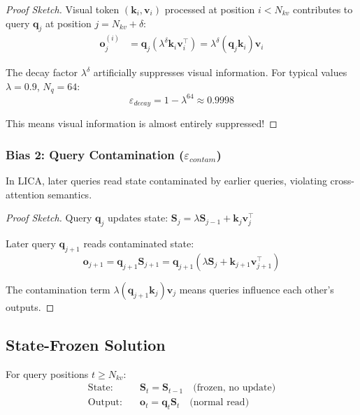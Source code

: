 \begin{proof}[Proof Sketch]
Visual token $(\mathbf{k}_i, \mathbf{v}_i)$ processed at position $i < N_{kv}$ contributes to query $\mathbf{q}_j$ at position $j = N_{kv} + \delta$:
\begin{align}
\mathbf{o}_j^{(i)} &= \mathbf{q}_j (\lambda^{\delta} \mathbf{k}_i \mathbf{v}_i^\top) = \lambda^{\delta} (\mathbf{q}_j \mathbf{k}_i) \mathbf{v}_i
\end{align}

The decay factor $\lambda^{\delta}$ artificially suppresses visual information. For typical values $\lambda = 0.9$, $N_q = 64$:
$$\varepsilon_{decay} = 1 - \lambda^{64} \approx 0.9998$$

This means visual information is almost entirely suppressed!
\end{proof}

\subsubsection{Bias 2: Query Contamination ($\varepsilon_{contam}$)}

\begin{theorem}
In LICA, later queries read state contaminated by earlier queries, violating cross-attention semantics.
\end{theorem}

\begin{proof}[Proof Sketch]
Query $\mathbf{q}_j$ updates state: $\mathbf{S}_j = \lambda \mathbf{S}_{j-1} + \mathbf{k}_j \mathbf{v}_j^\top$

Later query $\mathbf{q}_{j+1}$ reads contaminated state:
$$\mathbf{o}_{j+1} = \mathbf{q}_{j+1} \mathbf{S}_{j+1} = \mathbf{q}_{j+1}(\lambda \mathbf{S}_j + \mathbf{k}_{j+1} \mathbf{v}_{j+1}^\top)$$

The contamination term $\lambda (\mathbf{q}_{j+1} \mathbf{k}_j) \mathbf{v}_j$ means queries influence each other's outputs.
\end{proof}

\subsection{State-Frozen Solution}

\begin{definition}
For query positions $t \geq N_{kv}$:
\begin{align}
\text{State:} \quad &\mathbf{S}_t = \mathbf{S}_{t-1} \quad \text{(frozen, no update)} \\
\text{Output:} \quad &\mathbf{o}_t = \mathbf{q}_t \mathbf{S}_t \quad \text{(normal read)}
\end{align}
\end{definition}


